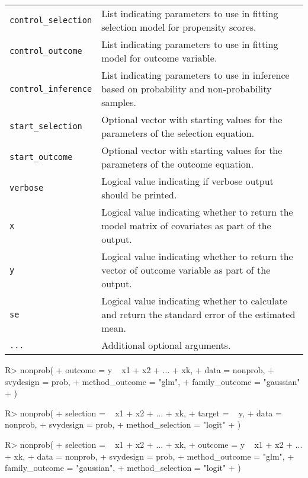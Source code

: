 \documentclass[
]{jss}
\begin{document}
\begin{longtable}{>{\ttfamily}p{5cm}p{10.5cm}}
    \texttt{control\_selection} & List indicating parameters to use in fitting selection model for propensity scores. \\
    \texttt{control\_outcome} & List indicating parameters to use in fitting model for outcome variable. \\
    \texttt{control\_inference} & List indicating parameters to use in inference based on probability and non-probability samples. \\
    \texttt{start\_selection} & Optional vector with starting values for the parameters of the selection equation. \\
    \texttt{start\_outcome} & Optional vector with starting values for the parameters of the outcome equation. \\
    \texttt{verbose} & Logical value indicating if verbose output should be printed. \\
    \texttt{x} & Logical value indicating whether to return the model matrix of covariates as part of the output. \\
    \texttt{y} & Logical value indicating whether to return the vector of outcome variable as part of the output. \\
    \texttt{se} & Logical value indicating whether to calculate and return the standard error of the estimated mean. \\
    \texttt{...} & Additional optional arguments. \\
\end{longtable}

\begin{CodeChunk}
\begin{CodeInput}
R> nonprob(
+   outcome = y ~ x1 + x2 + ... + xk, 
+   data = nonprob, 
+   svydesign = prob, 
+   method_outcome = "glm", 
+   family_outcome = "gaussian"
+ )
\end{CodeInput}
\end{CodeChunk}

\begin{CodeChunk}
\begin{CodeInput}
R> nonprob(
+   selection =  ~ x1 + x2 + ... + xk, 
+   target = ~ y, 
+   data = nonprob, 
+   svydesign = prob, 
+   method_selection = "logit"
+ )
\end{CodeInput}
\end{CodeChunk}

\begin{CodeChunk}
\begin{CodeInput}
R> nonprob(
+   selection = ~ x1 + x2 + ... + xk, 
+   outcome = y ~ x1 + x2 + ... + xk, 
+   data = nonprob, 
+   svydesign = prob, 
+   method_outcome = "glm", 
+   family_outcome = "gaussian",
+   method_selection = "logit"
+ )
\end{CodeInput}
\end{CodeChunk}
\end{document}
